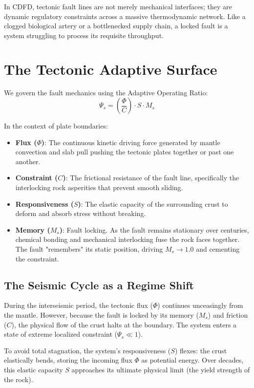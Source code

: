 \documentclass[11pt,a4paper]{article}
\begin{document}
In CDFD, tectonic fault lines are not merely mechanical interfaces; they are dynamic regulatory constraints across a massive thermodynamic network. Like a clogged biological artery or a bottlenecked supply chain, a locked fault is a system struggling to process its requisite throughput.

\section{The Tectonic Adaptive Surface}
We govern the fault mechanics using the Adaptive Operating Ratio:
\begin{equation}
    \Psi_s = \left( \frac{\Phi}{C} \right) \cdot S \cdot M_s
\end{equation}

In the context of plate boundaries:
\begin{itemize}
    \item \textbf{Flux ($\Phi$)}: The continuous kinetic driving force generated by mantle convection and slab pull pushing the tectonic plates together or past one another.
    \item \textbf{Constraint ($C$)}: The frictional resistance of the fault line, specifically the interlocking rock asperities that prevent smooth sliding.
    \item \textbf{Responsiveness ($S$)}: The elastic capacity of the surrounding crust to deform and absorb stress without breaking.
    \item \textbf{Memory ($M_s$)}: Fault locking. As the fault remains stationary over centuries, chemical bonding and mechanical interlocking fuse the rock faces together. The fault "remembers" its static position, driving $M_s \to 1.0$ and cementing the constraint.
\end{itemize}

\subsection{The Seismic Cycle as a Regime Shift}
During the interseismic period, the tectonic flux ($\Phi$) continues unceasingly from the mantle. However, because the fault is locked by its memory ($M_s$) and friction ($C$), the physical flow of the crust halts at the boundary. The system enters a state of extreme localized constraint ($\Psi_s \ll 1$).

To avoid total stagnation, the system's responsiveness ($S$) flexes: the crust elastically bends, storing the incoming flux $\Phi$ as potential energy. Over decades, this elastic capacity $S$ approaches its ultimate physical limit (the yield strength of the rock).
\end{document}
